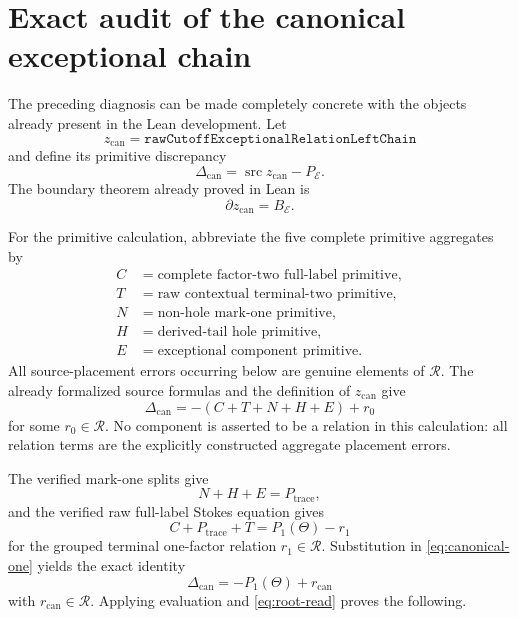 \documentclass[11pt]{article}
\theoremstyle{definition}
\theoremstyle{remark}
\newcommand{\Rel}{\mathcal R}
\newcommand{\src}{\operatorname{src}}
\begin{document}
\section{Exact audit of the canonical exceptional chain}

The preceding diagnosis can be made completely concrete with the objects
already present in the Lean development.  Let
\[
 z_{\mathrm{can}}=
 \texttt{rawCutoffExceptionalRelationLeftChain}
\]
and define its primitive discrepancy
\[
 \Delta_{\mathrm{can}}
   =\src z_{\mathrm{can}}-P_{\mathcal E}.
\]
The boundary theorem already proved in Lean is
\[
                         \partial z_{\mathrm{can}}=B_{\mathcal E}.
\]

For the primitive calculation, abbreviate the five complete primitive
aggregates by
\begin{align*}
 C&=\text{complete factor-two full-label primitive},\\
 T&=\text{raw contextual terminal-two primitive},\\
 N&=\text{non-hole mark-one primitive},\\
 H&=\text{derived-tail hole primitive},\\
 E&=\text{exceptional component primitive}.
\end{align*}
All source-placement errors occurring below are genuine elements of
\(\Rel\).  The already formalized source formulas and the definition of
\(z_{\mathrm{can}}\) give
\begin{equation}
                         \Delta_{\mathrm{can}}
            =-(C+T+N+H+E)+r_0                         \label{eq:canonical-one}
\end{equation}
for some \(r_0\in\Rel\).  No component is asserted to be a relation in
this calculation: all relation terms are the explicitly constructed
aggregate placement errors.

The verified mark-one splits give
\begin{equation}
                         N+H+E=P_{\mathrm{trace}},           \label{eq:mark-split}
\end{equation}
and the verified raw full-label Stokes equation gives
\begin{equation}
 C+P_{\mathrm{trace}}+T
       =P_1(\Theta)-r_1                                    \label{eq:raw-stokes}
\end{equation}
for the grouped terminal one-factor relation \(r_1\in\Rel\).  Substitution
in \eqref{eq:canonical-one} yields the exact identity
\begin{equation}
                         \Delta_{\mathrm{can}}
             =-P_1(\Theta)+r_{\mathrm{can}}                 \label{eq:canonical-root}
\end{equation}
with \(r_{\mathrm{can}}\in\Rel\).  Applying evaluation and
\eqref{eq:root-read} proves the following.
\end{document}
